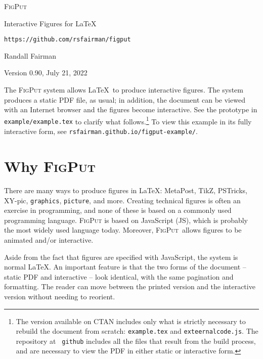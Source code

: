 \documentclass[10pt]{article}
\begin{document}
\VerbatimFootnotes

\newcommand{\figput}{\textsc{FigPut}}


\begin{center}
  {\Large \figput}
  
  Interactive Figures for \LaTeX

  \verb=https://github.com/rsfairman/figput=

  Randall Fairman

  Version 0.90, July 21, 2022
\end{center}

\vskip 0.2cm

The \textsc{FigPut} system allows \LaTeX\ to produce interactive
figures. The system produces a static PDF file, as usual; in addition,
the document can be viewed with an Internet browser and the figures
become interactive. See the prototype in {\tt example/example.tex}
to clarify what follows.\footnote{The version available on CTAN
includes only what is strictly necessary to rebuild the document from
scratch: {\tt example.tex} and {\tt exteernalcode.js}. The repository at {\tt
  github} includes all the files that result from the build process,
and are necessary to view the PDF in  either static or interactive
form.} To view this example in its fully interactive form, see
\verb=rsfairman.github.io/figput-example/=.

\section{Why \normalfont\scshape{FigPut}}

There are many ways to produce figures in \LaTeX: MetaPost, TikZ,
PSTricks, XY-pic, {\tt graphics}, {\tt picture}, and more. Creating
technical figures is often an exercise in programming, and none of
these is based on a commonly used programming
language. \textsc{FigPut} is based on JavaScript (JS), which is
probably the most widely used language today. Moreover,
\figput\ allows figures to be animated and/or interactive.

Aside from the fact that figures are specified with
JavaScript, the system is normal \LaTeX. An important feature is that
the two forms of the document -- static PDF and interactive -- look 
identical, with the same pagination and formatting. The reader can
move between the printed version and the interactive version without
needing to reorient. 
\end{document}
